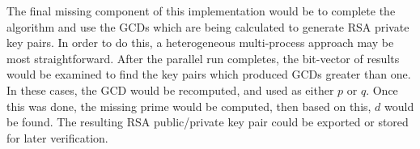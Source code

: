 \documentclass[10pt, conference]{./IEEEtran}
\begin{document}
The final missing component of this implementation would be to complete the 
algorithm and use the GCDs which are being calculated to generate RSA private 
key pairs. In order to do this, a heterogeneous multi-process approach may be 
most straightforward. After the parallel run completes, the bit-vector of 
results would be examined to find the key pairs which produced GCDs greater 
than one. In these cases, the GCD would be recomputed, and used as either $p$ 
or $q$. Once this was done, the missing prime would be computed, then based on 
this, $d$ would be found. The resulting RSA public/private key pair could be 
exported or stored for later verification.

%


\end{document}
